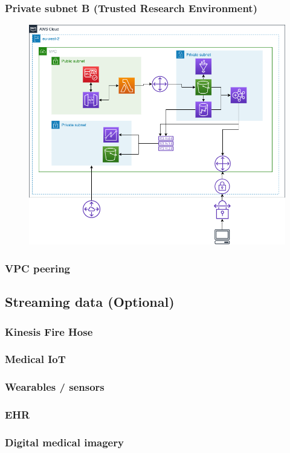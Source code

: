 \documentclass[10pt]{article}
\begin{document}
\subsubsection{Private subnet B (Trusted Research Environment)}
\begin{figure}[h!]
	\centering
	\includegraphics[width=0.8\linewidth]{images/Network.png}
\end{figure}
\subsubsection{VPC peering}

\subsection{Streaming data (Optional)}
\subsubsection{Kinesis Fire Hose}
\subsubsection{Medical IoT}
\subsubsection{Wearables / sensors}
\subsubsection{EHR}
\subsubsection{Digital medical imagery}
\end{document}
